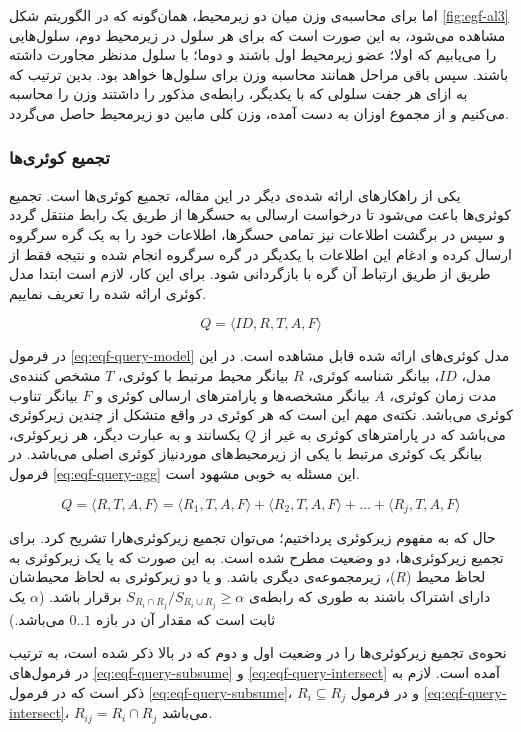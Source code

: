 \par
اما برای محاسبه‌ی وزن میان دو زیرمحیط، همان‌گونه که در الگوریتم شکل \ref{fig:egf-al3} مشاهده می‌شود، به این صورت است که برای هر سلول در زیرمحیط دوم، سلول‌هایی را می‌یابیم که اولا؛ عضو زیرمحیط اول باشند و دوما؛ با سلول مدنظر مجاورت داشته باشند. سپس باقی مراحل همانند محاسبه وزن برای سلول‌ها خواهد بود. بدین ترتیب که به ازای هر جفت سلولی که با یکدیگر، رابطه‌ی مذکور را داشتند وزن را محاسبه می‌کنیم و از مجموع اوزان به دست آمده، وزن کلی مابین دو زیرمحیط حاصل می‌گردد.

\subsubsection{تجمیع کوئری‌ها}
یکی از راهکارهای ارائه شده‌ی دیگر در این مقاله، تجمیع کوئری‌ها است. تجمیع کوئری‌ها باعث می‌شود تا درخواست ارسالی به حسگرها از طریق یک رابط منتقل گردد و سپس در برگشت اطلاعات نیز تمامی حسگر‌ها، اطلاعات خود را به یک گره سرگروه ارسال کرده و ادغام این اطلاعات با یکدیگر در گره سرگروه انجام شده و نتیجه فقط از طریق از طریق ارتباط آن گره با  بازگردانی شود. برای این کار، لازم است ابتدا مدل کوئری ارائه شده را تعریف نماییم.

\begin{equation}
Q = \langle ID, R, T, A, F \rangle
\label{eq:eqf-query-model}
\end{equation}

در فرمول \ref{eq:eqf-query-model} مدل کوئری‌های ارائه شده قابل مشاهده است. در این مدل، $ID$، بیانگر شناسه کوئری، $R$ بیانگر محیط مرتبط با کوئری، $T$ مشخص کننده‌ی مدت زمان کوئری، $A$ بیانگر مشخصه‌ها و پارامترهای ارسالی کوئری و $F$ بیانگر تناوب کوئری می‌باشد. نکته‌ی مهم این است که هر کوئری در واقع متشکل از چندین زیرکوئری می‌باشد که در پارامتر‌های کوئری به غیر از $Q$ یکسانند و به عبارت دیگر، هر زیرکوئری، بیانگر یک کوئری مرتبط با یکی از زیرمحیط‌های موردنیاز کوئری اصلی می‌باشد. در فرمول \ref{eq:eqf-query-agg} این مسئله به خوبی مشهود است.

\begin{equation}
Q = \langle R, T, A, F \rangle = \langle R_1, T, A, F \rangle + \langle R_2, T, A, F \rangle + \ldots + \langle R_j, T, A, F \rangle
\label{eq:eqf-query-agg}
\end{equation}

حال که به مفهوم زیرکوئری پرداختیم؛ می‌توان تجمیع زیرکوئری‌هارا تشریح کرد. برای تجمیع زیرکوئری‌ها، دو وضعیت مطرح شده است. به این صورت که یا یک زیرکوئری به لحاظ محیط ($R$)، زیرمجموعه‌ی دیگری باشد. و یا دو زیرکوئری به لحاظ محیط‌شان دارای اشتراک باشند به طوری که رابطه‌ی
 $S_{R_i \cap R_j}/S_{R_i \cup R_j} \geq \alpha$ 
 برقرار باشد. ($\alpha$ یک ثابت است که مقدار آن در بازه $0..1$ می‌باشد.)
\par
نحوه‌ی تجمیع زیرکوئری‌ها را در وضعیت اول و دوم که در بالا ذکر شده است، به ترتیب در فرمول‌های \ref{eq:eqf-query-subsume} و \ref{eq:eqf-query-intersect} آمده است. لازم به ذکر است که در فرمول \ref{eq:eqf-query-subsume}، 
$R_i \subseteq R_j$
 و در فرمول \ref{eq:eqf-query-intersect}، 
$R_{ij} = R_i \cap R_j$ می‌باشد.

